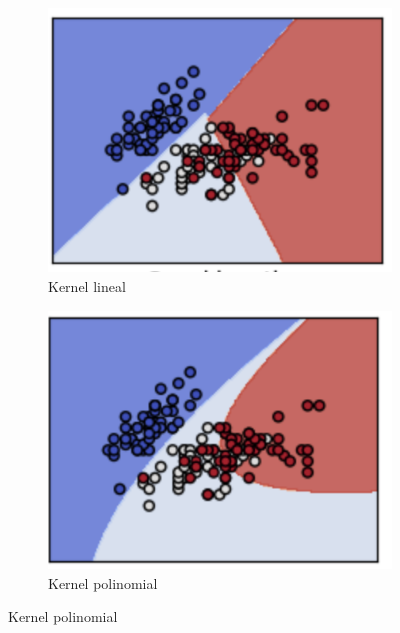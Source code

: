 \begin{enumerate}
\begin{itemize}
    \begin{figure}[h]
      \centering
        \begin{subfigure}{.25\textwidth}
        \centering
        \includegraphics[scale=0.4]{imagenes/Entrenamiento/klineal.png}
        \caption{Kernel lineal}
        \label{fig:cp5:klineal}
        \end{subfigure}%
        \begin{subfigure}{.25\textwidth}
        \centering
        \includegraphics[scale=0.4]{imagenes/Entrenamiento/kpoli.png}
        \caption{Kernel polinomial}
        \label{fig:cp5:kpoli}
        \end{subfigure}%
    

\end{figure}
\end{itemize}
\end{enumerate}
